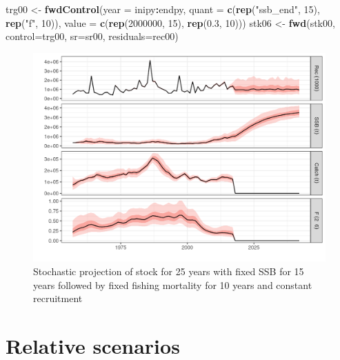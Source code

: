 \documentclass[
]{book}
\newenvironment{Shaded}{\begin{snugshade}}{\end{snugshade}}
\newcommand{\AttributeTok}[1]{\textcolor[rgb]{0.13,0.29,0.53}{#1}}
\newcommand{\DecValTok}[1]{\textcolor[rgb]{0.00,0.00,0.81}{#1}}
\newcommand{\FloatTok}[1]{\textcolor[rgb]{0.00,0.00,0.81}{#1}}
\newcommand{\FunctionTok}[1]{\textcolor[rgb]{0.13,0.29,0.53}{\textbf{#1}}}
\newcommand{\NormalTok}[1]{#1}
\newcommand{\OtherTok}[1]{\textcolor[rgb]{0.56,0.35,0.01}{#1}}
\newcommand{\SpecialCharTok}[1]{\textcolor[rgb]{0.81,0.36,0.00}{\textbf{#1}}}
\newcommand{\StringTok}[1]{\textcolor[rgb]{0.31,0.60,0.02}{#1}}
\begin{document}
\begin{Shaded}
\begin{Highlighting}[]
\NormalTok{trg00 }\OtherTok{\textless{}{-}} \FunctionTok{fwdControl}\NormalTok{(}\AttributeTok{year =}\NormalTok{ inipy}\SpecialCharTok{:}\NormalTok{endpy, }\AttributeTok{quant =} \FunctionTok{c}\NormalTok{(}\FunctionTok{rep}\NormalTok{(}\StringTok{"ssb\_end"}\NormalTok{, }\DecValTok{15}\NormalTok{), }\FunctionTok{rep}\NormalTok{(}\StringTok{"f"}\NormalTok{, }\DecValTok{10}\NormalTok{)),}
    \AttributeTok{value =} \FunctionTok{c}\NormalTok{(}\FunctionTok{rep}\NormalTok{(}\DecValTok{2000000}\NormalTok{, }\DecValTok{15}\NormalTok{), }\FunctionTok{rep}\NormalTok{(}\FloatTok{0.3}\NormalTok{, }\DecValTok{10}\NormalTok{)))}
\NormalTok{stk06 }\OtherTok{\textless{}{-}} \FunctionTok{fwd}\NormalTok{(stk00, }\AttributeTok{control=}\NormalTok{trg00, }\AttributeTok{sr=}\NormalTok{sr00, }\AttributeTok{residuals=}\NormalTok{rec00)}
\end{Highlighting}
\end{Shaded}

\begin{figure}
\centering
\includegraphics{_bookdown_files/_main_files/figure-html/unnamed-chunk-126-1.png}
\caption{\label{fig:unnamed-chunk-126}Stochastic projection of stock for 25 years with fixed SSB for 15 years followed by fixed fishing mortality for 10 years and constant recruitment}
\end{figure}

\hypertarget{relative-scenarios}{%
\section{Relative scenarios}\label{relative-scenarios}}
\end{document}
